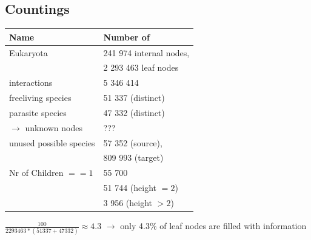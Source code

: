     \subsection{Countings}
      \begin{center}
        \begin{tabular}{ | l | l | }
          \hline
          Name & Number of \\
          \hline \hline
          Eukaryota & 241 974 internal nodes, \\
          & 2 293 463 leaf nodes \\ \hline
          interactions & 5 346 414 \\ \hline
          freeliving species & 51 337 (distinct) \\ \hline
          parasite species &  47 332 (distinct) \\ \hline
          $\rightarrow$ unknown nodes & ??? \\ \hline
          unused possible species & 57 352 (source), \\
          & 809 993 (target) \\
          \hline
          Nr of Children $== 1$ & 55 700 \\
          & 51 744 (height $=2$) \\
          & 3 956 (height $>2$) \\ \hline
        \end{tabular}
      \end{center}
      $\frac{100}{2293463 * (51337 + 47332)} \approx 4.3$ $\rightarrow$ only 4.3\% of leaf nodes are 
        filled with information

